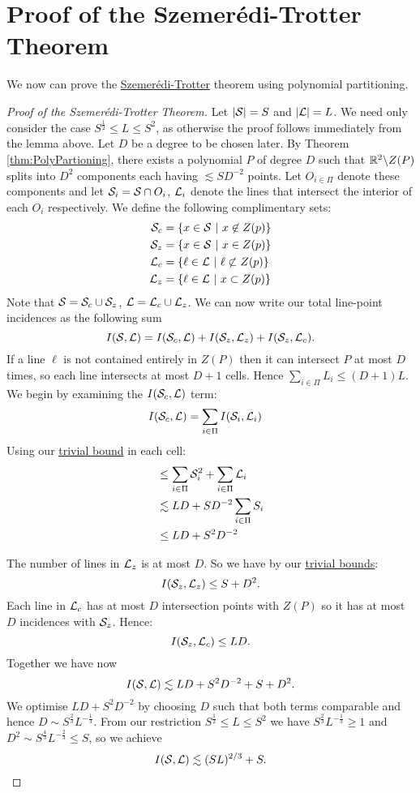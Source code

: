 \section{Proof of the Szemerédi-Trotter Theorem}
We now can prove the \hyperref[thm:S-T]{Szemerédi-Trotter} theorem using polynomial partitioning.
\begin{proof}[Proof of the Szemerédi-Trotter Theorem]
Let $|\mathcal S| = S$ and $|\mathcal L| = L$.
We need only consider the case $S^{\frac{1}{2}} \leq L \leq S^2$, as otherwise the proof follows immediately from the lemma above. 
Let $D$ be a degree to be chosen later. By Theorem \ref{thm:PolyPartioning}, there
exists a polynomial $P$ of degree $D$ such that $\mathbb R^2 \backslash Z(P)$ splits into $D^2$ components each having $\lesssim SD^{-2}$ points. 
Let $O_{i \in \Pi}$ denote these components and let $\mathcal S_i = \mathcal S \cap O_i$, $\mathcal L_i$ denote the lines that intersect the interior of each $O_i$ respectively.
We define the following complimentary sets:
\begin{align*}
    \mathcal S_c &=\{x \in \mathcal S \ |\ x \not \in Z(p)\}\\
    \mathcal S_z &=\{x \in \mathcal S \ |\ x \in Z(p)\}\\
    \mathcal L_c &=\{\ell \in \mathcal L \ |\ \ell \not \subset Z(p)\}\\
    \mathcal L_z &=\{\ell \in \mathcal L \ |\ x \subset Z(p)\}
\end{align*} 
Note that $\mathcal S = \mathcal S_c \cup \mathcal S_z$, $\mathcal L = \mathcal L_c \cup \mathcal L_z$. We can now write our total line-point incidences as the following sum
$$I(\mathcal S, \mathcal L) = I(\mathcal S_c, \mathcal L) + I(\mathcal S_z, \mathcal L_z) + I(\mathcal S_z, \mathcal L_c).$$
If a line $\ell$ is not contained entirely in $Z(P)$ then it can intersect $P$ at most $D$ times, 
 so each line intersects at most $D+1$ cells. Hence $\sum_{i \in \Pi} L_i \leq (D+1)L$. We begin by examining the $I(\mathcal S_c, \mathcal L)$ term:
\begin{align*}
I(\mathcal S_c, \mathcal L) &= \sum_{i \in \Pi} I(\mathcal S_i, \mathcal L_i)
\end{align*}
Using our \hyperref[thm:trivial-ST-bounds]{trivial bound} in each cell:
\begin{align*}
&\leq \sum_{i \in \Pi} \mathcal S_i^2 + \sum_{i \in \Pi} \mathcal L_i\\
&\lesssim LD + SD^{-2} \sum_{i \in \Pi} S_i\\ &\leq LD + S^2D^{-2}
\end{align*} 


The number of lines in $\mathcal L_z$ is at most $D$. So we have by our \hyperref[thm:trivial-ST-bounds]{trivial bounds}:
$$I(\mathcal S_z, \mathcal L_z) \leq S + D^2.$$
Each line in $\mathcal L_c$ has at most $D$ intersection points with $Z(P)$ so it has at most $D$ incidences with $\mathcal S_z$. Hence:
 $$I(\mathcal S_z, \mathcal L_c) \leq LD.$$
Together we have now 
$$I(\mathcal S, \mathcal L) \lesssim LD + S^2D^{-2} +S + D^2.$$
We optimise $LD + S^2D^{-2}$ by choosing $D$ such that both terms comparable and hence $D \sim S^{\frac{2}{3}} L^{-\frac{1}{3}}$. 
From our restriction $S^{\frac{1}{2}} \leq L \leq S^2$ we have $S^{\frac{2}{3}} L^{-\frac{1}{3}} \geq 1$
and $D^2 \sim S^{\frac{4}{3}} L^{-\frac{2}{3}} \leq S$, so we achieve
$$I(\mathcal S, \mathcal L) \lesssim (SL)^{2/3} + S. $$


\end{proof}
